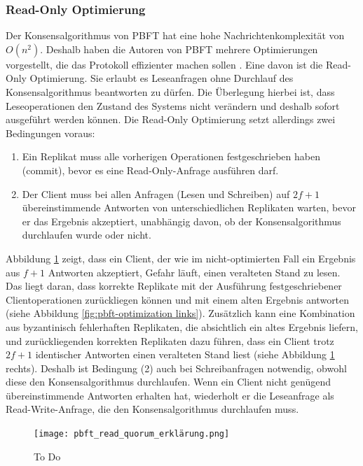 \documentclass[nonacm,sigconf,natbib=false]{acmart}
\begin{document}
\subsubsection{Read-Only Optimierung}

Der Konsensalgorithmus von PBFT hat eine hohe Nachrichtenkomplexität von $O(n^2)$. Deshalb haben die Autoren von PBFT mehrere Optimierungen vorgestellt, die das Protokoll effizienter machen sollen \cite{pbft-optimization}. Eine davon ist die Read-Only Optimierung. Sie erlaubt es Leseanfragen ohne Durchlauf des Konsensalgorithmus beantworten zu dürfen. Die Überlegung hierbei ist, dass Leseoperationen den Zustand des Systems nicht verändern und deshalb sofort ausgeführt werden können. Die Read-Only Optimierung setzt allerdings zwei Bedingungen voraus:
\begin{enumerate}
  \item Ein Replikat muss alle vorherigen Operationen festgeschrieben haben (commit), bevor es eine Read-Only-Anfrage ausführen darf.
  \item Der Client muss bei allen Anfragen (Lesen und Schreiben) auf $2f+1$ übereinstimmende Antworten von unterschiedlichen Replikaten warten, bevor er das Ergebnis akzeptiert, unabhängig davon, ob der Konsensalgorithmus durchlaufen wurde oder nicht. 
\end{enumerate}
Abbildung \ref{fig:pbft-optimization} zeigt, dass ein Client, der wie im nicht-optimierten Fall ein Ergebnis aus $f+1$ Antworten akzeptiert, Gefahr läuft, einen veralteten Stand zu lesen. Das liegt daran, dass korrekte Replikate mit der Ausführung festgeschriebener Clientoperationen zurückliegen können und mit einem alten Ergebnis antworten (siehe Abbildung \ref{fig:pbft-optimization links}). Zusätzlich kann eine Kombination aus byzantinisch fehlerhaften Replikaten, die absichtlich ein altes Ergebnis liefern, und zurückliegenden korrekten Replikaten dazu führen, dass ein Client trotz $2f+1$ identischer Antworten einen veralteten Stand liest (siehe Abbildung \ref{fig:pbft-optimization} rechts). Deshalb ist Bedingung (2) auch bei Schreibanfragen notwendig, obwohl diese den Konsensalgorithmus durchlaufen. Wenn ein Client nicht genügend übereinstimmende Antworten erhalten hat, wiederholt er die Leseanfrage als Read-Write-Anfrage, die den Konsensalgorithmus durchlaufen muss.

\begin{figure}
  \centering
  \texttt{[image: pbft\_read\_quorum\_erklärung.png]}
  \caption{To Do}
  \label{fig:pbft-optimization}
\end{figure}
\end{document}
